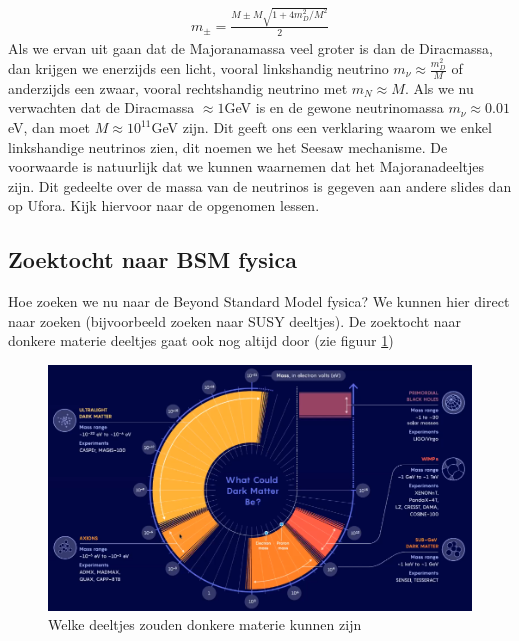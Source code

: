 \documentclass[../main.tex]{subfiles}
\begin{document}
\begin{equation}
    \begin{aligned}
        \label{eq:dirac_majorana_massa_opmenging}
        m_{\pm}=\frac{M \pm M \sqrt{1+4 m_{D}^{2} / M^{2}}}{2}
    \end{aligned}
\end{equation}
Als we ervan uit gaan dat de Majoranamassa veel groter is dan de Diracmassa, dan krijgen we enerzijds een licht, vooral linkshandig neutrino $m_{\nu} \approx \frac{m_{D}^{2}}{M}$ of anderzijds een zwaar, vooral rechtshandig neutrino met $m_{N} \approx M$. Als we nu verwachten dat de Diracmassa $\approx 1$GeV is en de gewone neutrinomassa $m_\nu\approx 0.01$eV, dan moet $M\approx 10^{11}$GeV zijn. Dit geeft ons een verklaring waarom we enkel linkshandige neutrinos zien, dit noemen we het Seesaw mechanisme. De voorwaarde is natuurlijk dat we kunnen waarnemen dat het Majoranadeeltjes zijn. {\color{green} Dit gedeelte over de massa van de neutrinos is gegeven aan andere slides dan op Ufora. Kijk hiervoor naar de opgenomen lessen.}

\subsection{Zoektocht naar BSM fysica}%
\label{sub:zoektocht_naar_bsm_fysica}

Hoe zoeken we nu naar de Beyond Standard Model fysica? We kunnen hier direct naar zoeken (bijvoorbeeld zoeken naar SUSY deeltjes). De zoektocht naar donkere materie deeltjes gaat ook nog altijd door (zie figuur \ref{fig:physics_beyond_the_standard_model/donkere_materie_mogelijkheden})

\begin{figure}[h]
    \centering
    \includegraphics[width=0.5\linewidth]{physics_beyond_the_standard_model/donkere_materie_mogelijkheden.png}
    \caption{Welke deeltjes zouden donkere materie kunnen zijn}%
    \label{fig:physics_beyond_the_standard_model/donkere_materie_mogelijkheden}
\end{figure}
\end{document}
